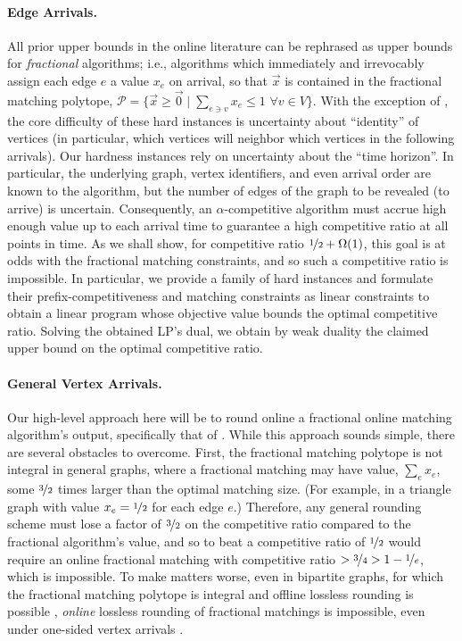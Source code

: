 \paragraph{Edge Arrivals.}
All prior upper bounds in the online literature \cite{karp1990optimal,epstein2013improved,huang2019tight,buchbinder2018online,feige2018tighter} can be rephrased as upper bounds for \emph{fractional} algorithms; i.e., algorithms which immediately and irrevocably assign each edge $e$ a value $x_e$ on arrival, so that $\vec{x}$ is contained in the fractional matching polytope, $\mathcal{P}=\{\vec{x}\geq \vec{0} \mid \sum_{e\ni v} x_e \leq 1\,\,\forall v\in V\}$. 
With the exception of \cite{buchbinder2018online}, the core difficulty of these hard instances is uncertainty about ``identity'' of vertices (in particular, which vertices will neighbor which vertices in the following arrivals). 
Our hardness instances rely on uncertainty about the ``time horizon''. In particular, the underlying graph, vertex identifiers, and even arrival order are known to the algorithm, but the number of edges of the graph to be revealed (to arrive) is uncertain. Consequently, an $\alpha$-competitive algorithm must accrue high enough value up to each arrival time to guarantee a high competitive ratio at all points in time. As we shall show, for competitive ratio  $\nicefrac{1}{2}+\Omega(1)$, this goal is at odds with the fractional matching constraints, and so such a competitive ratio is impossible.
In particular, we provide a family of hard instances and formulate their prefix-competitiveness and matching constraints as linear constraints to obtain a linear program whose objective value bounds the optimal competitive ratio. Solving the obtained LP's dual, we obtain by weak duality the claimed upper bound on the optimal competitive ratio.


\paragraph{General Vertex Arrivals.}
Our high-level approach here will be to round online a fractional online matching algorithm's output, specifically that of \citet{wang2015two}. While this approach sounds simple, there are several obstacles to overcome. First, the fractional matching polytope is not integral in general graphs, where a fractional matching may have value, $\sum_e x_e$, some $\nicefrac{3}{2}$ times larger than the optimal matching size. (For example, in a triangle graph with value $x_e=\nicefrac{1}{2}$ for each edge $e$.)
Therefore, any general rounding scheme must lose a factor of $\nicefrac{3}{2}$ on the competitive ratio compared to the fractional algorithm's value, and so to beat a competitive ratio of  $\nicefrac{1}{2}$ would require an online fractional matching with competitive ratio $> \nicefrac{3}{4} > 1-\nicefrac{1}{e}$, which is impossible. To make matters worse, even in bipartite graphs, for which the fractional matching polytope is integral and offline lossless rounding is possible  \cite{ageev2004pipage,gandhi2006dependent}, \emph{online} lossless rounding of fractional matchings is impossible, even under one-sided vertex arrivals  \cite{cohen2018randomized}. 

